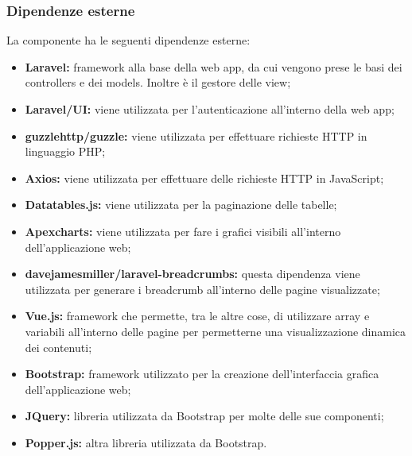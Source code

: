 	\subsubsection{Dipendenze esterne}
		La componente ha le seguenti dipendenze esterne:
		\begin{itemize}
			\item \textbf{Laravel:} framework alla base della web app, da cui vengono prese le basi dei controllers e dei models. Inoltre è il gestore delle view;
			\item \textbf{Laravel/UI:} viene utilizzata per l'autenticazione all'interno della web app;
			\item \textbf{guzzlehttp/guzzle:} viene utilizzata per effettuare richieste HTTP in linguaggio PHP;
			\item \textbf{Axios:} viene utilizzata per effettuare delle richieste HTTP in JavaScript;
			\item \textbf{Datatables.js:} viene utilizzata per la paginazione delle tabelle;
			\item \textbf{Apexcharts:} viene utilizzata per fare i grafici visibili all'interno dell'applicazione web;
			\item \textbf{davejamesmiller/laravel-breadcrumbs:} questa dipendenza viene utilizzata per generare i breadcrumb all'interno delle pagine visualizzate;
			\item \textbf{Vue.js:} framework che permette, tra le altre cose, di utilizzare array e variabili all'interno delle pagine per permetterne una visualizzazione dinamica dei contenuti;
			\item \textbf{Bootstrap:} framework utilizzato per la creazione dell'interfaccia grafica dell'applicazione web;
			\item \textbf{JQuery:} libreria utilizzata da Bootstrap per molte delle sue componenti;
			\item \textbf{Popper.js:} altra libreria utilizzata da Bootstrap.
		\end{itemize}



